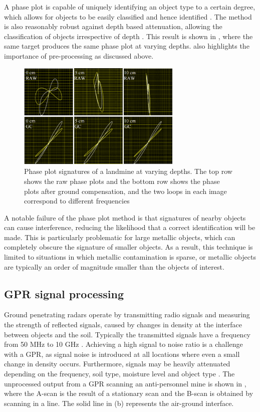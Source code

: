 \documentclass[main.tex]{subfiles}
\begin{document}
A phase plot is capable of uniquely identifying an object type to a certain degree, which allows for objects to be easily classified and hence identified \parencite{bruschini02}. The method is also reasonably robust against depth based attenuation, allowing the classification of objects irrespective of depth \parencite{Kruger2006}. This result is shown in , where the same target produces the same phase plot at varying depths.  also highlights the importance of pre-processing as discussed above.
\begin{figure}[ht]
\includegraphics[width=0.7\textwidth]{2-LiteratureReview/compensated-signature.png}
\centering
\caption[Phase plot signatures of a landmine at varying depths]{Phase plot signatures of a landmine at varying depths. The top row shows the raw phase plots and the bottom row shows the phase plots after ground compensation, and the two loops in each image correspond to different frequencies \parencite{Kruger2006}} 
\end{figure}

A notable failure of the phase plot method is that signatures of nearby objects can cause interference, reducing the likelihood that a correct identification will be made\parencite{Kruger2006}. This is particularly problematic for large metallic objects, which can completely obscure the signature of smaller objects. As a result, this technique is limited to situations in which metallic contamination is sparse, or metallic objects are typically an order of magnitude smaller than the objects of interest.

\subsection{GPR signal processing}
Ground penetrating radars operate by transmitting radio signals and measuring the strength of reflected signals, caused by changes in density at the interface between objects and the soil. Typically the transmitted signals have a frequency from 50 MHz to 10 GHz \parencite{Ho2008}. Achieving a high signal to noise ratio is a challenge with a GPR, as signal noise is introduced at all locations where even a small change in density occurs. Furthermore, signals may be heavily attenuated depending on the frequency, soil type, moisture level and object type \parencite{Annan20091}. The unprocessed output from a GPR scanning an anti-personnel mine is shown in , where the A-scan is the result of a stationary scan and the B-scan is obtained by scanning in a line. The solid line in  (b) represents the air-ground interface.
\end{document}
